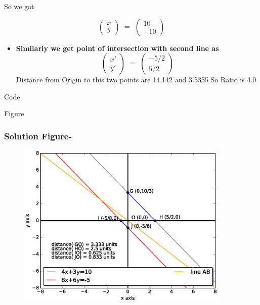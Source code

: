 \documentclass[11pt]{beamer}
\begin{document}
\begin{frame}
\begin{itemize}
So we got

\[\left(\begin{array}{cc}
x\\
y
\end{array}\right)
\
\begin{matrix}
=
\end{matrix}
\
%
\left(\begin{array}{cc}
10\\
-10
\end{array}\right)
\]
\end{itemize}
\end{frame}

\begin{frame}
\begin{itemize}
\item \textbf{Similarly we get point of intersection with second line as}
\[\left(\begin{array}{cc}
x'\\
y'
\end{array}\right)
\
%
\begin{matrix}
=
\end{matrix}
\
%
\left(\begin{array}{cc}
-5/2\\
5/2
\end{array}\right)
\]
Distance from Origin to this two points are 14.142 and 3.5355
So Ratio is 4.0
\end{itemize}
\end{frame}

\begin{frame}{Code}
\href{https://github.com/rahul-1510/Introduction-to-AI-ML}{}
\end{frame}

\begin{frame}{Figure}
\frametitle{Solution Figure-}
		\begin{figure}
    		\centering
    		\includegraphics[width = 0.9\textwidth]{./assign1op.eps}
  		\end{figure}
\end{frame}
\end{document}
